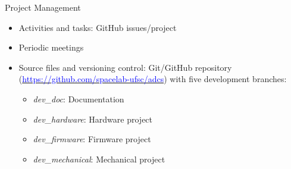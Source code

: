 %
%
%
%
%

%
%
%
%
%


\begin{frame}{Project Management}

    \begin{itemize}
        \item Activities and tasks: GitHub issues/project
        \vspace{0.25cm}
        \item Periodic meetings
        \vspace{0.25cm}
        \item Source files and versioning control: Git/GitHub repository (\href{https://github.com/spacelab-ufsc/adcs}{\textcolor{blue}{https://github.com/spacelab-ufsc/adcs}}) with five development branches:
            \begin{itemize}
                \item \textit{dev\_doc}: Documentation
                \item \textit{dev\_hardware}: Hardware project
                \item \textit{dev\_firmware}: Firmware project
                \item \textit{dev\_mechanical}: Mechanical project
            \end{itemize}
    \end{itemize}

\end{frame}


